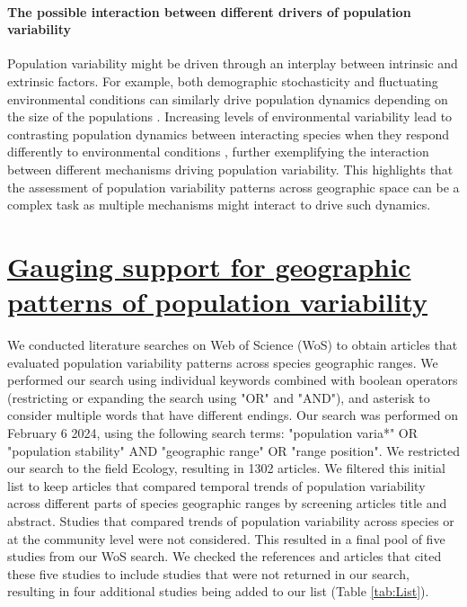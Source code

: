 \paragraph*{The possible interaction between different drivers of population variability}%

Population variability might be driven through an interplay between intrinsic and extrinsic factors. For example, both demographic stochasticity and fluctuating environmental conditions can similarly drive population dynamics depending on the size of the populations \parencite{melbourne2008}. Increasing levels of environmental variability lead to contrasting population dynamics between interacting species when they respond differently to environmental conditions  \parencite{dee2020}, further exemplifying the interaction between different mechanisms driving population variability. This highlights that the assessment of population variability patterns across geographic space can be a complex task as multiple mechanisms might interact to drive such dynamics.
 



\section*{\textbf{\underline{Gauging support for geographic patterns of population variability}}}

We conducted literature searches on Web of Science (WoS) to obtain articles that evaluated population variability patterns across species geographic ranges. We performed our search using individual keywords combined with boolean operators (restricting or expanding the search using "OR" and "AND"), and asterisk to consider multiple words that have different endings. Our search was performed on February 6 2024, using the following search terms: "population varia*" OR "population stability" AND "geographic range" OR "range position". We restricted our search to the field Ecology, resulting in 1302 articles. We filtered this initial list to keep articles that compared temporal trends of population variability across different parts of species geographic ranges by screening articles title and abstract. Studies that compared trends of population variability across species or at the community level were not considered. This resulted in a final pool of five studies from our WoS search. We checked the references and articles that cited these five studies to include studies that were not returned in our search, resulting in four additional studies being added to our list (Table \ref{tab:List}). 


